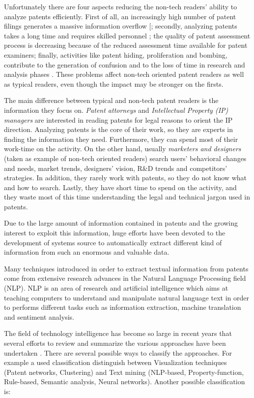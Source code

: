 \documentclass[]{book}
\begin{document}
Unfortunately there are four aspects reducing the non-tech readers'
ability to analyze patents efficiently. First of all, an increasingly
high number of patent filings generates a massive information overflow
{[}\citet{bergmann2008evaluating}; secondly, analyzing patents takes a
long time and requires skilled personnel \citep{liang2007text}; the
quality of patent assessment process is decreasing
\citep[\citet{philipp2006}]{burke2007} because of the reduced assessment
time available for patent examiners; finally, activities like patent
hiding, proliferation and bombing, contribute to the generation of
confusion and to the loss of time in research and analysis phases
\citep{fantoni2013automatic}. These problems affect non-tech oriented
patent readers as well as typical readers, even though the impact may be
stronger on the firsts.

The main difference between typical and non-tech patent readers is the
information they focus on. \emph{Patent attorneys} and
\emph{Intellectual Property (IP) managers} are interested in reading
patents for legal reasons to orient the IP direction. Analyzing patents
is the core of their work, so they are experts in finding the
information they need. Furthermore, they can spend most of their
work-time on the activity. On the other hand, usually \emph{marketers
and designers} (taken as example of non-tech oriented readers) search
users' behavioral changes and needs, market trends, designers' vision,
R\&D trends and competitors' strategies. In addition, they rarely work
with patents, so they do not know what and how to search. Lastly, they
have short time to spend on the activity, and they waste most of this
time understanding the legal and technical jargon used in patents.

Due to the large amount of information contained in patents and the
growing interest to exploit this information, huge efforts have been
devoted to the development of systems source to automatically extract
different kind of information from such an enormous and valuable data.

Many techniques introduced in order to extract textual information from
patents come from extensive research advances in the Natural Language
Processing field (NLP). NLP is an area of research and artificial
intelligence which aims at teaching computers to understand and
manipulate natural language text in order to performs different tasks
such as information extraction, machine translation and sentiment
analysis.

The field of technology intelligence has become so large in recent years
that several efforts to review and summarize the various approaches have
been undertaken \citep{abbas2014literature}. There are several possible
ways to classify the approaches. For example a used classification
distinguish between Visualization techniques (Patent networks,
Clustering) and Text mining (NLP-based, Property-function, Rule-based,
Semantic analysis, Neural networks). Another possible classification is:
\end{document}
